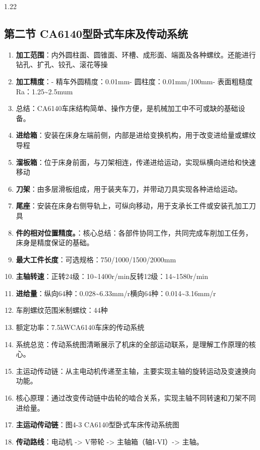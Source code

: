 \documentclass[12pt,a4paper]{article}
\begin{document}
\begin{spacing}{1.22}
\subsection{第二节 CA6140型卧式车床及传动系统}
\begin{tcolorbox}[colback=yellow!6,colframe=red!55!black,title=重点,left=1mm,right=1mm]
\begin{enumerate}[leftmargin=2.2em,label=\arabic*.]
  \item \textbf{加工范围}：内外圆柱面、圆锥面、环槽、成形面、端面及各种螺纹。还能进行钻孔、扩孔、铰孔、滚花等操
  \item \textbf{加工精度}：- 精车外圆精度：0.01mm- 圆柱度：0.01mm/100mm- 表面粗糙度Ra：1.25\textasciitilde{}2.5mum
  \item 总结：CA6140车床结构简单、操作方便，是机械加工中不可或缺的基础设备。
  \item \textbf{进给箱}：安装在床身左端前侧，内部是进给变换机构，用于改变进给量或螺纹导程
  \item \textbf{溜板箱}：位于床身前面，与刀架相连，传递进给运动，实现纵横向进给和快速移动
  \item \textbf{刀架}：由多层滑板组成，用于装夹车刀，并带动刀具实现各种进给运动。
  \item \textbf{尾座}：安装在床身右侧导轨上，可纵向移动，用于支承长工件或安装孔加工刀具
  \item \textbf{件的相对位置精度。}：核心总结：各部件协同工作，共同完成车削加工任务，床身是精度保证的基础。
  \item \textbf{最大工件长度}：可选规格：750/1000/1500/2000mm
  \item \textbf{主轴转速}：正转24级：10\textasciitilde{}1400r/min反转12级：14\textasciitilde{}1580r/min
  \item \textbf{进给量}：纵向64种：0.028\textasciitilde{}6.33mm/r横向64种：0.014\textasciitilde{}3.16mm/r
  \item 车削螺纹范围米制螺纹：44种
  \item 额定功率：7.5kWCA6140车床的传动系统
  \item 系统总览：传动系统图清晰展示了机床的全部运动联系，是理解工作原理的核心。
  \item 主运动传动链：从主电动机传递至主轴，主要实现主轴的旋转运动及变速换向功能。
  \item 核心原理：通过改变传动链中齿轮的啮合关系，实现主轴不同转速和刀架不同进给量。
  \item \textbf{主运动传动链}：图4-3 CA6140型卧式车床传动系统图
  \item \textbf{传动路线}：电动机 -> V带轮 -> 主轴箱（轴I-VI）-> 主轴。

\end{enumerate}
\end{tcolorbox}
\end{spacing}
\end{document}
